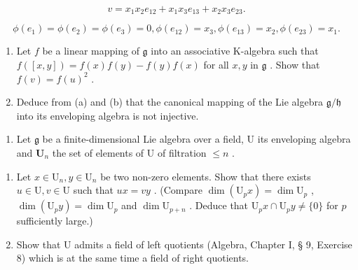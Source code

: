 \[
v = x _ {1} x _ {2} e _ {1 2} + x _ {1} x _ {3} e _ {1 3} + x _ {2} x _ {3} e _ {2 3}.
\]

\[
\phi \left(e _ {1}\right) = \phi \left(e _ {2}\right) = \phi \left(e _ {3}\right) = 0, \phi \left(e _ {1 2}\right) = x _ {3}, \phi \left(e _ {1 3}\right) = x _ {2}, \phi \left(e _ {2 3}\right) = x _ {1}.
\]

\begin{enumerate}
\def\labelenumi{(\alph{enumi})}
\setcounter{enumi}{1}
\item
  Let \(f\) be a linear mapping of \(\mathfrak{g}\) into an associative K-algebra such that \(f([x,y]) = f(x)f(y) - f(y)f(x)\) for all \(x, y\) in \(\mathfrak{g}\) . Show that \(f(v) = f(u)^2\) .
\item
  Deduce from (a) and (b) that the canonical mapping of the Lie algebra \(\mathfrak{g} / \mathfrak{h}\) into its enveloping algebra is not injective.
\end{enumerate}

\begin{enumerate}
\def\labelenumi{\arabic{enumi}.}
\setcounter{enumi}{9}
\tightlist
\item
  Let \(\mathfrak{g}\) be a finite-dimensional Lie algebra over a field, U its enveloping algebra and \(\mathbf{U}_n\) the set of elements of U of filtration \(\leqslant n\) .
\end{enumerate}

\begin{enumerate}
\def\labelenumi{(\alph{enumi})}
\item
  Let \(x \in \mathrm{U}_n, y \in \mathrm{U}_n\) be two non-zero elements. Show that there exists \(u \in \mathrm{U}, v \in \mathrm{U}\) such that \(ux = vy\) . (Compare \(\dim(\mathrm{U}_p x) = \dim \mathrm{U}_p\) , \(\dim(\mathrm{U}_p y) = \dim \mathrm{U}_p\) and \(\dim \mathrm{U}_{p+n}\) . Deduce that \(\mathrm{U}_p x \cap \mathrm{U}_p y \neq \{0\}\) for \(p\) sufficiently large.)
\item
  Show that U admits a field of left quotients (Algebra, Chapter I, § 9, Exercise 8) which is at the same time a field of right quotients.
\end{enumerate}


